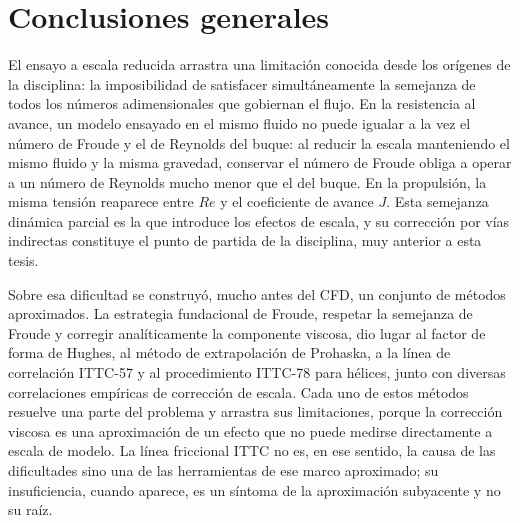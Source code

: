 \chapter{Conclusiones generales} \label{cap:conclusiones_generales}

El ensayo a escala reducida arrastra una limitación conocida desde los orígenes
de la disciplina: la imposibilidad de satisfacer simultáneamente la semejanza de
todos los números adimensionales que gobiernan el flujo. En la resistencia al
avance, un modelo ensayado en el mismo fluido no puede igualar a la vez el número
de Froude y el de Reynolds del buque: al reducir la escala manteniendo el mismo
fluido y la misma gravedad, conservar el número de Froude obliga a operar a un número
de Reynolds mucho menor que el del buque. En la propulsión, la
misma tensión reaparece entre $Re$ y el coeficiente de avance $J$. Esta semejanza
dinámica parcial es la que introduce los efectos de escala, y su corrección por
vías indirectas constituye el punto de partida de la disciplina, muy anterior a
esta tesis.

Sobre esa dificultad se construyó, mucho antes del CFD, un conjunto de métodos
aproximados. La estrategia fundacional de Froude, respetar la semejanza de Froude
y corregir analíticamente la componente viscosa, dio lugar al factor de forma de
Hughes, al método de extrapolación de Prohaska, a la línea de correlación ITTC-57
y al procedimiento ITTC-78 para hélices, junto con diversas correlaciones
empíricas de corrección de escala. Cada uno de estos métodos resuelve una parte
del problema y arrastra sus limitaciones, porque la corrección viscosa es una
aproximación de un efecto que no puede medirse directamente a escala de modelo. La
línea friccional ITTC no es, en ese sentido, la causa de las dificultades sino una
de las herramientas de ese marco aproximado; su insuficiencia, cuando aparece, es un
síntoma de la aproximación subyacente y no su raíz.

